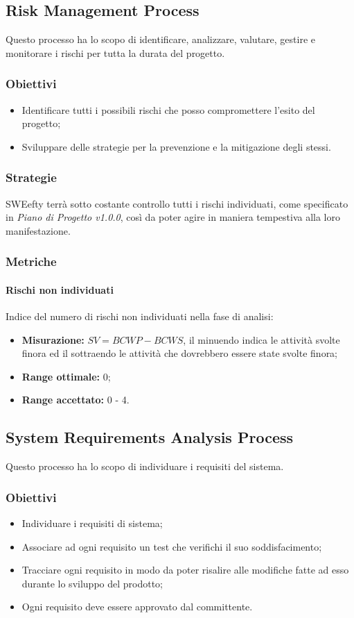 	\subsection{Risk Management Process}
Questo processo ha lo scopo di identificare, analizzare, valutare, gestire e monitorare i rischi per tutta la durata del progetto.
\subsubsection{Obiettivi}
\begin{itemize}
	\item Identificare tutti i possibili rischi che posso compromettere l'esito del progetto;
	\item Sviluppare delle strategie per la prevenzione e la mitigazione degli stessi.
\end{itemize}
\subsubsection{Strategie}
SWEefty terrà sotto costante controllo tutti i rischi individuati, come specificato in \emph{Piano di Progetto v1.0.0}, così da poter agire in maniera tempestiva alla loro manifestazione.

\subsubsection{Metriche}
\paragraph{Rischi non individuati} \Spazio
Indice del numero di rischi non individuati nella fase di analisi:
	\begin{itemize}
		\item \textbf{Misurazione: }$SV = BCWP - BCWS$, il minuendo indica le attività svolte finora ed il sottraendo le attività che dovrebbero essere state svolte finora;
		\item \textbf{Range ottimale: }0;
		\item \textbf{Range accettato: }0 - 4.
	\end{itemize}


\subsection{System Requirements Analysis Process}
Questo processo ha lo scopo di individuare i requisiti del sistema.
\subsubsection{Obiettivi}
\begin{itemize}
	\item Individuare i requisiti di sistema;
	\item Associare ad ogni requisito un test che verifichi il suo soddisfacimento; 
	\item Tracciare ogni requisito in modo da poter risalire alle modifiche fatte ad esso durante lo sviluppo del prodotto;
	\item Ogni requisito deve essere approvato dal committente.
\end{itemize}
